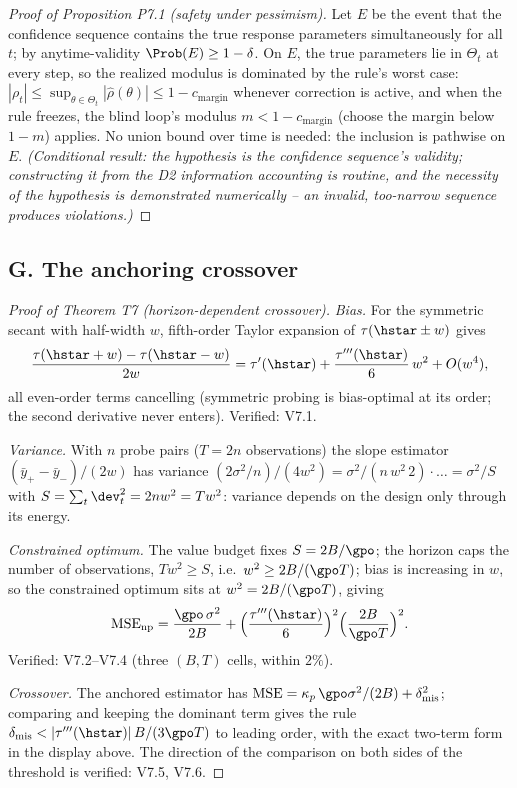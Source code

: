 \documentclass[11pt]{article}
\begin{document}
\begin{proof}[Proof of Proposition P7.1 (safety under pessimism)]
Let $E$ be the event that the confidence sequence contains the true
response parameters simultaneously for all $t$; by anytime-validity
$\Prob(E) \ge 1-\delta$. On $E$, the true parameters lie in $\Theta_t$ at
every step, so the realized modulus is dominated by the rule's worst case:
$|\rho_t| \le \sup_{\theta\in\Theta_t}|\hat\rho(\theta)| \le 1 -
c_{\mathrm{margin}}$ whenever correction is active, and when the rule
freezes, the blind loop's modulus $m < 1 - c_{\mathrm{margin}}$ (choose the
margin below $1 - m$) applies. No union bound over time is needed: the
inclusion is pathwise on $E$. \emph{(Conditional result: the hypothesis is
the confidence sequence's validity; constructing it from the D2
information accounting is routine, and the necessity of the hypothesis is
demonstrated numerically -- an invalid, too-narrow sequence produces
violations.)}
\end{proof}

\subsection*{G. The anchoring crossover}

\begin{proof}[Proof of Theorem T7 (horizon-dependent crossover)]
\emph{Bias.} For the symmetric secant with half-width $w$, fifth-order
Taylor expansion of $\tau(\hstar \pm w)$ gives
\[
\frac{\tau(\hstar + w) - \tau(\hstar - w)}{2w}
 = \tau'(\hstar) + \frac{\tau'''(\hstar)}{6}\,w^2 + O(w^4),
\]
all even-order terms cancelling (symmetric probing is bias-optimal at its
order; the second derivative never enters). Verified: V7.1.

\emph{Variance.} With $n$ probe pairs ($T = 2n$ observations) the slope
estimator $(\bar y_+ - \bar y_-)/(2w)$ has variance
$(2\sigma^2/n)/(4w^2) = \sigma^2/(n\,w^2\,2)\cdot\ldots = \sigma^2/S$ with
$S = \sum_t \dev_t^2 = 2n w^2 = T w^2$: variance depends on the design only
through its energy.

\emph{Constrained optimum.} The value budget fixes $S = 2B/\gpo$; the
horizon caps the number of observations, $T w^2 \ge S$, i.e.\
$w^2 \ge 2B/(\gpo T)$; bias is increasing in $w$, so the constrained
optimum sits at $w^2 = 2B/(\gpo T)$, giving
\[
\mathrm{MSE}_{\mathrm{np}} = \frac{\gpo\,\sigma^2}{2B}
 + \Big(\frac{\tau'''(\hstar)}{6}\Big)^2\Big(\frac{2B}{\gpo T}\Big)^2 .
\]
Verified: V7.2--V7.4 (three $(B, T)$ cells, within $2\%$).

\emph{Crossover.} The anchored estimator has
$\mathrm{MSE} = \kappa_p\,\gpo\sigma^2/(2B) + \delta_{\mathrm{mis}}^2$;
comparing and keeping the dominant term gives the rule
$\delta_{\mathrm{mis}} < |\tau'''(\hstar)|\,B/(3\gpo T)$ to leading order,
with the exact two-term form in the display above. The direction of the
comparison on both sides of the threshold is verified: V7.5, V7.6.
\end{proof}
\end{document}
